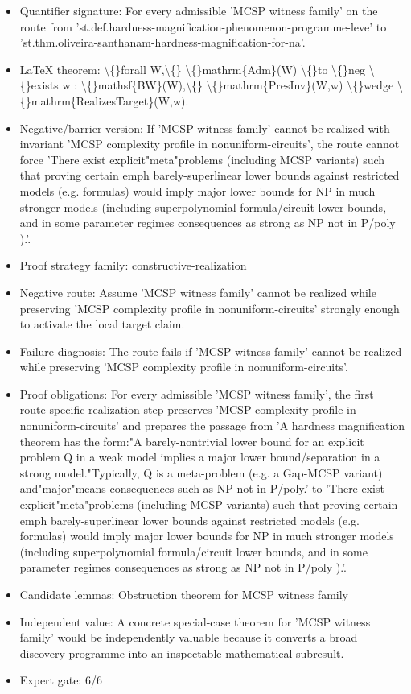 \documentclass[11pt]{article}
\begin{document}
\begin{itemize}
\item Quantifier signature: For every admissible 'MCSP witness family' on the route from 'st.def.hardness-magnification-phenomenon-programme-leve' to 'st.thm.oliveira-santhanam-hardness-magnification-for-na'.
\item LaTeX theorem: \textbackslash\{\}forall W,\textbackslash\{\} \textbackslash\{\}mathrm\{Adm\}(W) \textbackslash\{\}to \textbackslash\{\}neg \textbackslash\{\}exists w : \textbackslash\{\}mathsf\{BW\}(W),\textbackslash\{\} \textbackslash\{\}mathrm\{PresInv\}(W,w) \textbackslash\{\}wedge \textbackslash\{\}mathrm\{RealizesTarget\}(W,w).
\item Negative/barrier version: If 'MCSP witness family' cannot be realized with invariant 'MCSP complexity profile in nonuniform-circuits', the route cannot force 'There exist explicit"meta"problems (including MCSP variants) such that proving certain emph barely-superlinear lower bounds against restricted models (e.g. formulas) would imply major lower bounds for NP in much stronger models (including superpolynomial formula/circuit lower bounds, and in some parameter regimes consequences as strong as NP not in P/poly ).'.
\item Proof strategy family: constructive-realization
\item Negative route: Assume 'MCSP witness family' cannot be realized while preserving 'MCSP complexity profile in nonuniform-circuits' strongly enough to activate the local target claim.
\item Failure diagnosis: The route fails if 'MCSP witness family' cannot be realized while preserving 'MCSP complexity profile in nonuniform-circuits'.
\item Proof obligations: For every admissible 'MCSP witness family', the first route-specific realization step preserves 'MCSP complexity profile in nonuniform-circuits' and prepares the passage from 'A hardness magnification theorem has the form:"A barely-nontrivial lower bound for an explicit problem Q in a weak model implies a major lower bound/separation in a strong model."Typically, Q is a meta-problem (e.g. a Gap-MCSP variant) and"major"means consequences such as NP not in P/poly.' to 'There exist explicit"meta"problems (including MCSP variants) such that proving certain emph barely-superlinear lower bounds against restricted models (e.g. formulas) would imply major lower bounds for NP in much stronger models (including superpolynomial formula/circuit lower bounds, and in some parameter regimes consequences as strong as NP not in P/poly ).'.
\item Candidate lemmas: Obstruction theorem for MCSP witness family
\item Independent value: A concrete special-case theorem for 'MCSP witness family' would be independently valuable because it converts a broad discovery programme into an inspectable mathematical subresult.
\item Expert gate: 6/6
\end{itemize}
\end{document}
